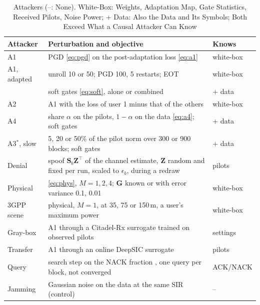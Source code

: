 \documentclass[journal]{IEEEtran}
\theoremstyle{remark}
\begin{document}
\begin{table}[t]
\centering
\caption{Attackers (--: None). White-Box: Weights, Adaptation Map, Gate Statistics, Received Pilots,
Noise Power; + Data: Also the Data and Its Symbols; Both Exceed What a Causal Attacker Can Know}\label{tab:attackers}
\scriptsize
\begin{tabular}{@{}L{13mm}L{56mm}L{14mm}@{}}
\toprule
Attacker & Perturbation and objective & Knows\\
\midrule
A1 \cite{wu2024} & PGD \eqref{eq:pgd} on the post-adaptation loss \eqref{eq:a1} & white-box\\
A1, adapted & unroll 10 or 50; PGD 100, 5 restarts; EOT \cite{athalye2018eot} & white-box\\
 & soft gates \eqref{eq:soft}, alone or combined & + data\\
A2 & A1 with the loss of user 1 minus that of the others & white-box\\
A4 & share $\alpha$ on the pilots, $1-\alpha$ on the data \eqref{eq:a4}; soft gates & + data\\
A3$^\ast$, slow & 5, 20 or 50\% of the pilot norm over 300 or 900 blocks; soft gates & + data\\
Denial & spoof $\bm S_b\bm Z^{\!\top}$ of the channel estimate, $\bm Z$ random and fixed per run, scaled to $\epsilon_b$, during a redraw & pilots\\
Physical & \eqref{eq:phys}, $M=1,2,4$; $\bm G$ known or with error variance 0.1, 0.01 & white-box\\
3GPP scene & physical, $M=1$, at 35, 75 or 150\,m, a user's maximum power & white-box\\
Gray-box & A1 through a Citadel-Rx surrogate trained on observed pilots & settings\\
Transfer & A1 through an online DeepSIC surrogate & pilots\\
Query & search step on the NACK fraction \cite{wierstra2014,ilyas2018}, one query per block, not converged & ACK/NACK\\
Jamming & Gaussian noise on the data at the same SIR (control) & --\\
\bottomrule
\end{tabular}
\end{table}
\end{document}
